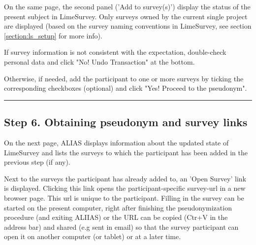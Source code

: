 On the same page, the second panel ('Add to survey(s)') display the status of the present subject in LimeSurvey. Only surveys owned by the current single project are displayed (based on the survey naming conventions in LimeSurvey, see section \ref{section:ls_setup} for more info).

\small\setlength\fboxsep{5pt}\setlength\fboxrule{1pt}

\large

If survey information is not consistent with the expectation, double-check personal data and click "No! Undo Transaction" at the bottom.

Otherwise, if needed, add the participant to one or more surveys by ticking the corresponding checkboxes (optional) and click "Yes! Proceed to the pseudonym".

\small\setlength\fboxsep{5pt}\setlength\fboxrule{1pt}

\large
\par\noindent\rule{\textwidth\color{pniblue}}{0.4pt}
\subsection*{Step 6. Obtaining pseudonym and survey links}

On the next page, ALIAS displays information about the updated state of LimeSurvey and lists the surveys to which the participant has been added in the previous step (if any).

Next to the surveys the participant has already added to, an 'Open Survey' link is displayed. Clicking this link opens the participant-specific survey-url in a new browser page. This url is unique to the participant. Filling in the survey can be started on the present computer, right after finishing the pseudonymization procedure (and exiting ALIIAS) or the URL can be copied (Ctr+V in the address bar) and shared (e.g sent in email) so that the survey participant can open it on another computer (or tablet) or at a later time.

